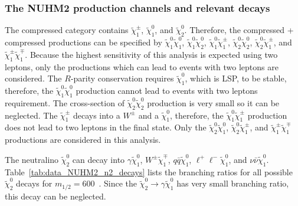 
\subsubsection{The NUHM2 production channels and relevant decays}
\label{subsubsec:data_channels_and_decays}
The compressed category contains $\widetilde{\chi}^{\pm}_{1}$, $\widetilde{\chi}^{0}_{1}$, and $\widetilde{\chi}^{0}_{2}$.
Therefore, the compressed + compressed productions can be specified by $\widetilde{\chi}^{0}_{1} \widetilde{\chi}^{0}_{1}$, $\widetilde{\chi}^{0}_{1} \widetilde{\chi}^{0}_{2}$, $\widetilde{\chi}^{0}_{1} \widetilde{\chi}^{\pm}_{1}$, $\widetilde{\chi}^{0}_{2} \widetilde{\chi}^{0}_{2}$, $\widetilde{\chi}^{0}_{2} \widetilde{\chi}^{\pm}_{1}$, and $\widetilde{\chi}^{\pm}_{1} \widetilde{\chi}^{\mp}_{1}$.
Because the highest sensitivity of this analysis is expected using two leptons, only the productions which can lead to events with two leptons are considered.
The $R$-parity conservation requires $\widetilde{\chi}^{0}_{1}$, which is LSP, to be stable, therefore, the $\widetilde{\chi}^{0}_{1} \widetilde{\chi}^{0}_{1}$ production cannot lead to events with two leptons requirement.
The cross-section of $\widetilde{\chi}^{0}_{2} \widetilde{\chi}^{0}_{2}$ production is very small so it can be neglected.
The $\widetilde{\chi}^{\pm}_{1}$ decays into a $W^{\pm}$ and a $\widetilde{\chi}^{0}_{1}$, therefore, the $\widetilde{\chi}^{0}_{1} \widetilde{\chi}^{\pm}_{1}$ production does not lead to two leptons in the final state.
Only the $\widetilde{\chi}^{0}_{2} \widetilde{\chi}^{0}_{1}$, $\widetilde{\chi}^{0}_{2} \widetilde{\chi}^{\pm}_{1}$, and $\widetilde{\chi}^{\pm}_{1} \widetilde{\chi}^{\mp}_{1}$ productions are considered in this analysis.

The neutralino $\widetilde{\chi}^{0}_{2}$ can decay into $\gamma \widetilde{\chi}^{0}_{1}$, $W^{\pm} \widetilde{\chi}^{\mp}_{1}$, $q\bar{q} \widetilde{\chi}^{0}_{1}$, $\ell^{+}\ell^{-} \widetilde{\chi}^{0}_{1}$, and $\nu\bar{\nu} \widetilde{\chi}^{0}_{1}$.
Table~\ref{tab:data_NUHM2_n2_decays} lists the branching ratios for all possible $\widetilde{\chi}^{0}_{2}$ decays for $m_{1/2} = 600$~{\GeV}.
Since the $\widetilde{\chi}^{0}_{2} \to \gamma \widetilde{\chi}^{0}_{1}$ has very small branching ratio, this decay can be neglected.

